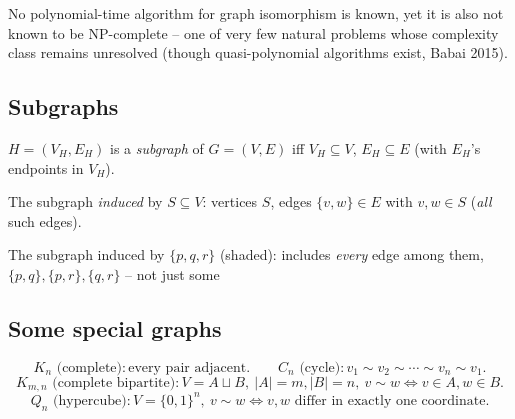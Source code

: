 \documentclass[11pt]{article}
\begin{document}
\begin{note}
No polynomial-time algorithm for graph isomorphism is known, yet it is also not known to be NP-complete -- one of very few natural problems whose complexity class remains unresolved (though quasi-polynomial algorithms exist, Babai 2015).
\end{note}

\subsection{Subgraphs}
\label{sec:11-5}

\begin{definition}[Subgraph]
$H=(V_H,E_H)$ is a \emph{subgraph} of $G=(V,E)$ iff $V_H\subseteq V$, $E_H\subseteq E$ (with $E_H$'s endpoints in $V_H$).
\end{definition}

\begin{definition}
The subgraph \emph{induced} by $S\subseteq V$: vertices $S$, edges $\{v,w\}\in E$ with $v,w\in S$ (\emph{all} such edges).
\end{definition}

\begin{center}
\end{center}
\begin{center}
\small The subgraph induced by $\{p,q,r\}$ (shaded): includes \emph{every} edge among them, $\{p,q\},\{p,r\},\{q,r\}$ -- not just some
\end{center}

\subsection{Some special graphs}
\label{sec:11-6}

\begin{definition}
\[
K_n \text{ (complete)}: \text{every pair adjacent}. \qquad C_n \text{ (cycle)}: v_1\sim v_2\sim\cdots\sim v_n\sim v_1.
\]
\[
K_{m,n} \text{ (complete bipartite)}: V=A\sqcup B,\ |A|=m,|B|=n,\ v\sim w \iff v\in A, w\in B.
\]
\[
Q_n \text{ (hypercube)}: V=\{0,1\}^n,\ v\sim w \iff v,w \text{ differ in exactly one coordinate}.
\]
\end{definition}
\end{document}
